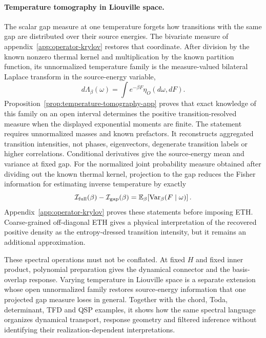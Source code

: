 \documentclass[a4paper,11pt]{article}
\def\dd{d}%
\def\ee{e}%
\theoremstyle{definition}
\theoremstyle{remark}
\newcommand{\dd}{\mathrm d}
\newcommand{\ee}{\mathrm e}
\begin{document}
\paragraph{Temperature tomography in Liouville space.}
The scalar gap measure at one temperature forgets how transitions with the same gap are
distributed over their source energies.  The bivariate measure of
appendix~\ref{app:operator-krylov} restores that coordinate.  After division by the known nonzero
thermal kernel and multiplication by the known partition function, its unnormalized temperature
family is the measure-valued bilateral Laplace transform in the source-energy variable,
\begin{equation}
   \dd\Lambda_\beta(\omega)
   =\int\ee^{-\beta F}\eta_O(\dd\omega,\dd F).
   \label{eq:temperature-tomography-main}
\end{equation}
Proposition~\ref{prop:temperature-tomography-app} proves that exact knowledge of this family on an
open interval determines the positive transition-resolved measure when the displayed exponential
moments are finite.  The statement requires unnormalized masses and known prefactors.  It
reconstructs aggregated transition intensities, not phases, eigenvectors, degenerate transition
labels or higher correlations.  Conditional derivatives give the source-energy mean and variance
at fixed gap.  For the normalized joint probability measure obtained after dividing out the known
thermal kernel, projection to the gap reduces the Fisher information for estimating
inverse temperature by exactly
\begin{equation}
   \mathcal I_{\rm full}(\beta)-\mathcal I_{\rm gap}(\beta)
   =\mathbb E_\beta\!\left[\operatorname{Var}_\beta(F\mid\omega)\right].
   \label{eq:temperature-fisher-deficit-main}
\end{equation}
Appendix~\ref{app:operator-krylov} proves these statements before imposing ETH.  Coarse-grained
off-diagonal ETH gives a physical interpretation of the recovered positive density as the
entropy-dressed transition intensity, but it remains an additional approximation.

These spectral operations must not be conflated.  At fixed $H$ and fixed inner product,
polynomial preparation gives the dynamical connector and the basis-overlap response.  Varying
temperature in Liouville space is a separate extension whose open unnormalized family restores
source-energy information that one projected gap measure loses in general.  Together with the
chord, Toda, determinant, TFD and QSP examples, it shows how the same spectral language organizes
dynamical transport, response geometry and filtered inference without identifying their
realization-dependent interpretations.
\end{document}
